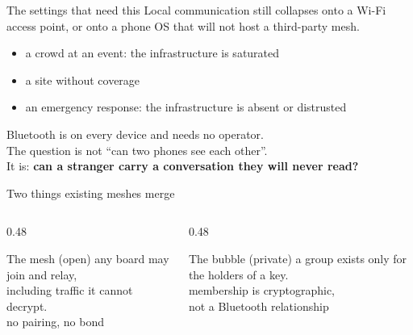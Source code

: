 \documentclass[aspectratio=169,11pt]{beamer}
\begin{document}
\begin{frame}{The settings that need this}
Local communication still collapses onto a Wi-Fi access point, or onto a
phone OS that will not host a third-party mesh.
\vspace{4mm}
\begin{itemize}
  \item a crowd at an event: the infrastructure is saturated
  \item a site without coverage
  \item an emergency response: the infrastructure is absent or distrusted
\end{itemize}
\vspace{5mm}
Bluetooth is on every device and needs no operator.\\[2mm]
The question is not ``can two phones see each other''.\\
It is: \textbf{can a stranger carry a conversation they will never read?}
\end{frame}

\begin{frame}{Two things existing meshes merge}
\begin{columns}[T,onlytextwidth]
\begin{column}{0.48\textwidth}
\begin{block}{The mesh (open)}
any board may join and relay,\\
including traffic it cannot decrypt.\\[2mm]
{\small no pairing, no bond}
\end{block}
\end{column}
\begin{column}{0.48\textwidth}
\begin{block}{The bubble (private)}
a group exists only for the holders of a key.\\[2mm]
{\small membership is cryptographic,\\not a Bluetooth relationship}
\end{block}
\end{column}
\end{columns}
\vspace{8mm}
\centering
{}
\end{frame}
\end{document}
